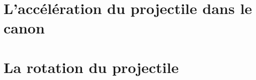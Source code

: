     \chapter{L'accélération du projectile dans le canon}
    \label{chap:acceleration_projectile_canon}
    

    \chapter{La rotation du projectile}
    \label{chap:rotation_projectile}
    


